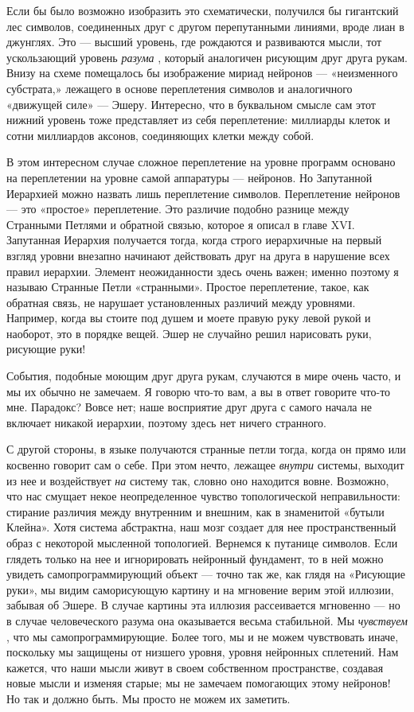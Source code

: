 Если бы было возможно изобразить это схематически, получился бы гигантский лес символов, соединенных друг с другом перепутанными линиями, вроде лиан в джунглях. Это --- высший уровень, где рождаются и развиваются мысли, тот ускользающий уровень \emph{разума} , который аналогичен рисующим друг друга рукам. Внизу на схеме помещалось бы изображение мириад нейронов --- «неизменного субстрата,» лежащего в основе переплетения символов и аналогичного «движущей силе» --- Эшеру. Интересно, что в буквальном смысле сам этот нижний уровень тоже представляет из себя переплетение: миллиарды клеток и сотни миллиардов аксонов, соединяющих клетки между собой.

В этом интересном случае сложное переплетение на уровне программ основано на переплетении на уровне самой аппаратуры --- нейронов. Но Запутанной Иерархией можно назвать лишь переплетение символов. Переплетение нейронов --- это «простое» переплетение. Это различие подобно разнице между Странными Петлями и обратной связью, которое я описал в главе XVI. Запутанная Иерархия получается тогда, когда строго иерархичные на первый взгляд уровни внезапно начинают действовать друг на друга в нарушение всех правил иерархии. Элемент неожиданности здесь очень важен; именно поэтому я называю Странные Петли «странными». Простое переплетение, такое, как обратная связь, не нарушает установленных различий между уровнями. Например, когда вы стоите под душем и моете правую руку левой рукой и наоборот, это в порядке вещей. Эшер не случайно решил нарисовать руки, рисующие руки!

События, подобные моющим друг друга рукам, случаются в мире очень часто, и мы их обычно не замечаем. Я говорю что-то вам, а вы в ответ говорите что-то мне. Парадокс? Вовсе нет; наше восприятие друг друга с самого начала не включает никакой иерархии, поэтому здесь нет ничего странного.

С другой стороны, в языке получаются странные петли тогда, когда он прямо или косвенно говорит сам о себе. При этом нечто, лежащее \emph{внутри} системы, выходит из нее и воздействует \emph{на} систему так, словно оно находится вовне. Возможно, что нас смущает некое неопределенное чувство топологической неправильности: стирание различия между внутренним и внешним, как в знаменитой «бутыли Клейна». Хотя система абстрактна, наш мозг создает для нее пространственный образ с некоторой мысленной топологией. Вернемся к путанице символов. Если глядеть только на нее и игнорировать нейронный фундамент, то в ней можно увидеть самопрограммирующий объект --- точно так же, как глядя на «Рисующие руки», мы видим саморисующую картину и на мгновение верим этой иллюзии, забывая об Эшере. В случае картины эта иллюзия рассеивается мгновенно --- но в случае человеческого разума она оказывается весьма стабильной. Мы \emph{чувствуем} , что мы самопрограммирующие. Более того, мы и не можем чувствовать иначе, поскольку мы защищены от низшего уровня, уровня нейронных сплетений. Нам кажется, что наши мысли живут в своем собственном пространстве, создавая новые мысли и изменяя старые; мы не замечаем помогающих этому нейронов! Но так и должно быть. Мы просто не можем их заметить.

